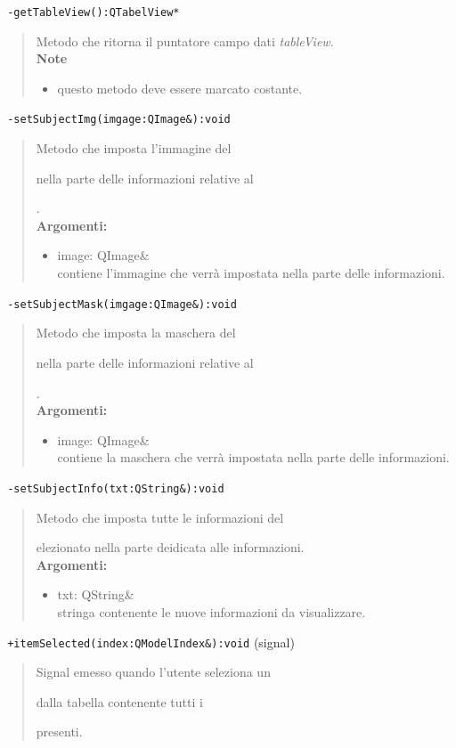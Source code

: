 \color{blue}\verb! -getTableView():QTabelView*!
\begin{quote}
\color{black}Metodo che ritorna il puntatore campo dati \emph{tableView}.\\
 \textbf{Note}
 \begin{itemize}
 \item questo metodo deve essere marcato costante.
 \end{itemize}
\end{quote}
\color{blue}\verb! -setSubjectImg(imgage:QImage&):void!
\begin{quote}
\color{black}Metodo che imposta l'immagine del \subject{} nella parte delle informazioni relative al \subject{}.\\
\textbf{Argomenti:}
\begin{itemize}
\item image: QImage\& \\ contiene l'immagine che verrà impostata nella parte delle informazioni.
\end{itemize}
\end{quote}
\color{blue}\verb! -setSubjectMask(imgage:QImage&):void!
\begin{quote}
\color{black}Metodo che imposta la maschera del \subject{} nella parte delle informazioni relative al \subject{}.\\
\textbf{Argomenti:}
\begin{itemize}
\item image: QImage\& \\ contiene la maschera che verrà impostata nella parte delle informazioni.
\end{itemize}
\end{quote}
\color{blue}\verb! -setSubjectInfo(txt:QString&):void!
\begin{quote}
\color{black}Metodo che imposta tutte le informazioni del \subject selezionato nella parte deidicata alle informazioni.\\
\textbf{Argomenti:}
\begin{itemize}
\item txt: QString\& \\ stringa contenente le nuove informazioni da visualizzare.
\end{itemize}
\end{quote}
\color{blue}\verb! +itemSelected(index:QModelIndex&):void! (signal)
\color{black} 
\begin{quote}
Signal\g{} emesso quando l'utente seleziona un \subject{} dalla tabella contenente tutti i \subject{} presenti.
\end{quote}
\pagebreak
\color{black}
